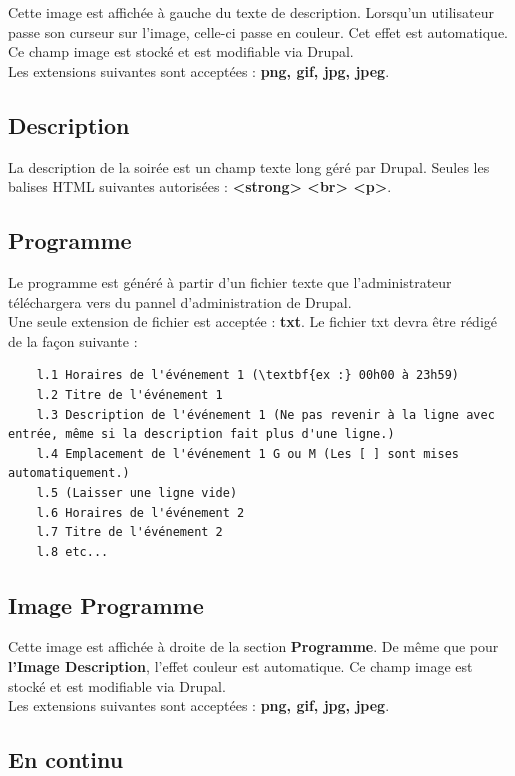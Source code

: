 \documentclass[11pt]{report}
\begin{document}
Cette image est affichée à gauche du texte de description. Lorsqu'un utilisateur
passe son curseur sur l'image, celle-ci passe en couleur. Cet effet est automatique.
Ce champ image est stocké et est modifiable via Drupal. \\
Les extensions suivantes sont acceptées : \textbf{png, gif, jpg, jpeg}.

\subsection{Description}

La description de la soirée est un champ texte long géré par Drupal.
Seules les balises HTML suivantes autorisées : \textbf{<strong> <br> <p>}.

\subsection{Programme}

Le programme est généré à partir d'un fichier texte que l'administrateur
téléchargera vers du pannel d'administration de Drupal. \\
Une seule extension de fichier est acceptée : \textbf{txt}.
Le fichier txt devra être rédigé de la façon suivante :
\begin{verbatim}
	l.1 Horaires de l'événement 1 (\textbf{ex :} 00h00 à 23h59)
	l.2 Titre de l'événement 1
	l.3 Description de l'événement 1 (Ne pas revenir à la ligne avec entrée, même si la description fait plus d'une ligne.)
	l.4 Emplacement de l'événement 1 G ou M (Les [ ] sont mises automatiquement.)
	l.5 (Laisser une ligne vide)
	l.6 Horaires de l'événement 2
	l.7 Titre de l'événement 2
	l.8 etc...
\end{verbatim}

\subsection{Image Programme}

Cette image est affichée à droite de la section \textbf{Programme}. De même que
pour \textbf{l'Image Description}, l'effet couleur est automatique.
Ce champ image est stocké et est modifiable via Drupal. \\
Les extensions suivantes sont acceptées : \textbf{png, gif, jpg, jpeg}.

\subsection{En continu}
\end{document}
